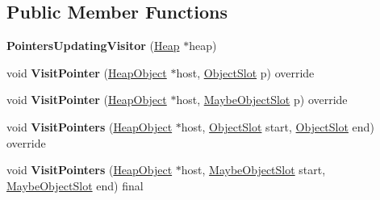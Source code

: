 \subsection*{Public Member Functions}
\begin{DoxyCompactItemize}
\item 
\mbox{\label{classv8_1_1internal_1_1PointersUpdatingVisitor_a84e6800ee618f900fbe6bad487fbbd28}} 
{\bfseries Pointers\+Updating\+Visitor} (\mbox{\hyperlink{classv8_1_1internal_1_1Heap}{Heap}} $\ast$heap)
\item 
\mbox{\label{classv8_1_1internal_1_1PointersUpdatingVisitor_a62efedced652b6dff0aacf3b8a852519}} 
void {\bfseries Visit\+Pointer} (\mbox{\hyperlink{classv8_1_1internal_1_1HeapObject}{Heap\+Object}} $\ast$host, \mbox{\hyperlink{classv8_1_1internal_1_1ObjectSlot}{Object\+Slot}} p) override
\item 
\mbox{\label{classv8_1_1internal_1_1PointersUpdatingVisitor_a487f3b64dd16974f3254fc8961f20932}} 
void {\bfseries Visit\+Pointer} (\mbox{\hyperlink{classv8_1_1internal_1_1HeapObject}{Heap\+Object}} $\ast$host, \mbox{\hyperlink{classv8_1_1internal_1_1MaybeObjectSlot}{Maybe\+Object\+Slot}} p) override
\item 
\mbox{\label{classv8_1_1internal_1_1PointersUpdatingVisitor_a253e30a3b01b6d7d34bf70307db33648}} 
void {\bfseries Visit\+Pointers} (\mbox{\hyperlink{classv8_1_1internal_1_1HeapObject}{Heap\+Object}} $\ast$host, \mbox{\hyperlink{classv8_1_1internal_1_1ObjectSlot}{Object\+Slot}} start, \mbox{\hyperlink{classv8_1_1internal_1_1ObjectSlot}{Object\+Slot}} end) override
\item 
\mbox{\label{classv8_1_1internal_1_1PointersUpdatingVisitor_ad47dd02ddbd2fe869bf1845a520ab183}} 
void {\bfseries Visit\+Pointers} (\mbox{\hyperlink{classv8_1_1internal_1_1HeapObject}{Heap\+Object}} $\ast$host, \mbox{\hyperlink{classv8_1_1internal_1_1MaybeObjectSlot}{Maybe\+Object\+Slot}} start, \mbox{\hyperlink{classv8_1_1internal_1_1MaybeObjectSlot}{Maybe\+Object\+Slot}} end) final
\item 
\mbox{\label{classv8_1_1internal_1_1PointersUpdatingVisitor_a3c237ad790bfe701c59919c4966279cc}} 

\end{DoxyCompactItemize}
